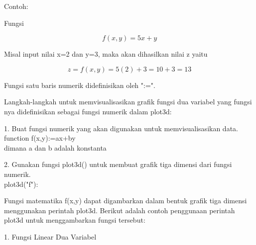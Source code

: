 \documentclass[a4paper,10pt]{article}
\begin{document}
\begin{eulernotebook}
\begin{eulercomment}
\begin{eulercomment}
\begin{eulercomment}
\begin{eulercomment}
\begin{eulercomment}
\begin{eulercomment}
\begin{eulercomment}
\begin{eulercomment}
\begin{eulercomment}
Contoh:

Fungsi\\
\end{eulercomment}
\begin{eulerformula}
\[
f(x,y) = 5x+y
\]
\end{eulerformula}
\begin{eulercomment}
Misal input nilai x=2 dan y=3, maka akan dihasilkan nilai z yaitu

\end{eulercomment}
\begin{eulerformula}
\[
z = f(x,y) = 5(2)+3 = 10+3 = 13
\]
\end{eulerformula}
\begin{eulercomment}
\end{eulercomment}
\begin{eulercomment}
Fungsi satu baris numerik didefinisikan oleh ":=".

Langkah-langkah untuk memvisualisasikan grafik fungsi dua variabel
yang fungsi nya didefinisikan sebagai fungsi numerik dalam plot3d:

1. Buat fungsi numerik yang akan digunakan untuk memvisualisasikan
data.\\
function f(x,y):=ax+by\\
dimana a dan b adalah konstanta

2. Gunakan fungsi plot3d() untuk membuat grafik tiga dimensi dari
fungsi numerik.\\
plot3d("f"):

\end{eulercomment}
\begin{eulercomment}
Fungsi matematika f(x,y) dapat digambarkan dalam bentuk grafik tiga
dimensi menggunakan perintah plot3d. Berikut adalah contoh penggunaan
perintah plot3d untuk menggambarkan fungsi tersebut:

1. Fungsi Linear Dua Variabel


\end{eulercomment}
\end{eulercomment}
\end{eulercomment}
\end{eulercomment}
\end{eulercomment}
\end{eulercomment}
\end{eulercomment}
\end{eulercomment}
\end{eulercomment}
\end{eulernotebook}
\end{document}
